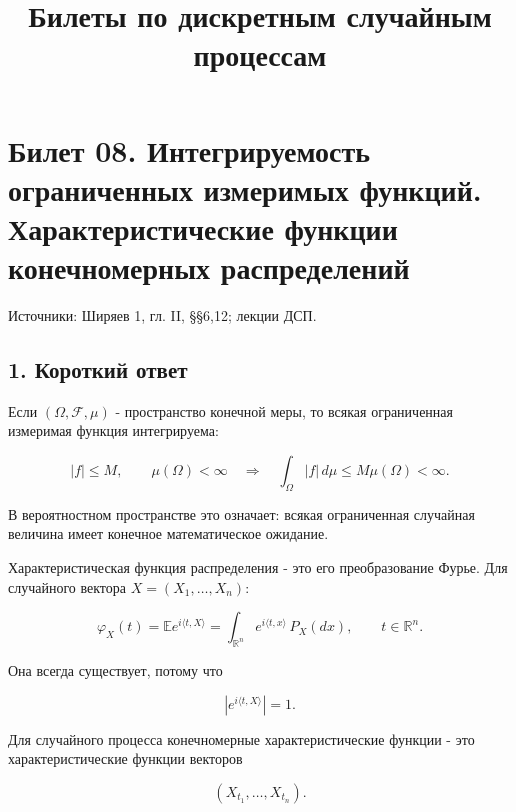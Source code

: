 \documentclass[
  11pt,
  a4paper,
]{article}
\title{Билеты по дискретным случайным процессам}
\author{}
\date{}
\begin{document}
\maketitle

\section{Билет 08. Интегрируемость ограниченных измеримых функций.
Характеристические функции конечномерных
распределений}\label{ux431ux438ux43bux435ux442-08.-ux438ux43dux442ux435ux433ux440ux438ux440ux443ux435ux43cux43eux441ux442ux44c-ux43eux433ux440ux430ux43dux438ux447ux435ux43dux43dux44bux445-ux438ux437ux43cux435ux440ux438ux43cux44bux445-ux444ux443ux43dux43aux446ux438ux439.-ux445ux430ux440ux430ux43aux442ux435ux440ux438ux441ux442ux438ux447ux435ux441ux43aux438ux435-ux444ux443ux43dux43aux446ux438ux438-ux43aux43eux43dux435ux447ux43dux43eux43cux435ux440ux43dux44bux445-ux440ux430ux441ux43fux440ux435ux434ux435ux43bux435ux43dux438ux439}

Источники: Ширяев 1, гл. II, §§6,12; лекции ДСП.

\subsection{1. Короткий
ответ}\label{ux43aux43eux440ux43eux442ux43aux438ux439-ux43eux442ux432ux435ux442}

Если \((\Omega,\mathcal F,\mu)\) - пространство конечной меры, то всякая
ограниченная измеримая функция интегрируема:

\[
|f|\le M,\qquad \mu(\Omega)<\infty
\quad\Longrightarrow\quad
\int_\Omega |f|\,d\mu\le M\mu(\Omega)<\infty.
\]

В вероятностном пространстве это означает: всякая ограниченная случайная
величина имеет конечное математическое ожидание.

Характеристическая функция распределения - это его преобразование Фурье.
Для случайного вектора \(X=(X_1,\ldots,X_n)\):

\[
\varphi_X(t)
=\mathbb E e^{i\langle t,X\rangle}
=\int_{\mathbb R^n} e^{i\langle t,x\rangle}\,P_X(dx),
\qquad t\in\mathbb R^n.
\]

Она всегда существует, потому что

\[
\left|e^{i\langle t,X\rangle}\right|=1.
\]

Для случайного процесса конечномерные характеристические функции - это
характеристические функции векторов

\[
(X_{t_1},\ldots,X_{t_n}).
\]
\end{document}
